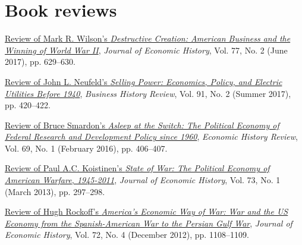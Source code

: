 \documentclass[11pt,letterpaper]{article}
\begin{document}
\vspace{-1em}
\section*{Book reviews}

\begin{description}[leftmargin=0in,itemsep=.25em,itemindent=.15in]
\item 	\href{https://doi.org/10.1017/S0022050717000432}{\color{black}
			Review of Mark R. Wilson's \emph{Destructive Creation: American Business and the Winning of World War II}}, 
			\emph{Journal of Economic History}, Vol. 77, No. 2 (June 2017), pp. 629--630.
\item 	\href{https://doi.org/10.1017/S0007680517000897}{\color{black}
			Review of John L. Neufeld's \emph{Selling Power: Economics, Policy, and Electric Utilities Before 1940}}, 
			\emph{Business History Review}, Vol. 91, No. 2 (Summer 2017), pp. 420--422.	
\item 	\href{https://doi.org/10.1111/ehr.12325}{\color{black} 
			Review of Bruce Smardon's \emph{Asleep at the Switch: The Political Economy of Federal Research and Development Policy since 1960}}, 
			\emph{Economic History Review}, Vol. 69, No. 1 (February 2016), pp. 406--407.
\item 	\href{https://doi.org/10.1017/S0022050713000168}{\color{black} 
			Review of Paul A.C. Koistinen's \emph{State of War: The Political Economy of American Warfare, 1945-2011}}, 
			\emph{Journal of Economic History}, Vol. 73, No. 1 (March 2013), pp. 297--298.
\item 	\href{https://doi.org/10.1017/S0022050712000800}{\color{black} 
			Review of Hugh Rockoff's \emph{America's Economic Way of War: War and the US Economy from the Spanish-American War to the Persian Gulf War}}, 
			\emph{Journal of Economic History}, Vol. 72, No. 4 (December 2012), pp. 1108--1109.
\end{description}

\vspace{-1em}
\end{document}
